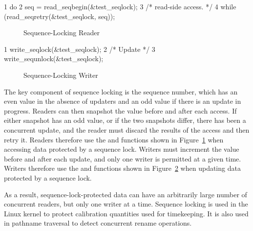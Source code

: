 { \scriptsize
\begin{verbbox}
  1 do {
  2   seq = read_seqbegin(&test_seqlock);
  3   /* read-side access. */
  4 } while (read_seqretry(&test_seqlock, seq));
\end{verbbox}
}
\begin{figure}[bp]
\centering
\theverbbox
\caption{Sequence-Locking Reader}
\label{fig:defer:Sequence-Locking Reader}
\end{figure}

{ \scriptsize
\begin{verbbox}
  1 write_seqlock(&test_seqlock);
  2 /* Update */
  3 write_sequnlock(&test_seqlock);
\end{verbbox}
}
\begin{figure}[bp]
\centering
\theverbbox
\caption{Sequence-Locking Writer}
\label{fig:defer:Sequence-Locking Writer}
\end{figure}

The key component of sequence locking is the sequence number, which has
an even value in the absence of updaters and an odd value if there
is an update in progress.
Readers can then snapshot the value before and after each access.
If either snapshot has an odd value, or if the two snapshots differ,
there has been a concurrent update, and the reader must discard
the results of the access and then retry it.
Readers therefore use the  and 
functions shown in Figure~\ref{fig:defer:Sequence-Locking Reader}
when accessing data protected by a sequence lock.
Writers must increment the value before and after each update,
and only one writer is permitted at a given time.
Writers therefore use the  and 
functions shown in Figure~\ref{fig:defer:Sequence-Locking Writer}
when updating data protected by a sequence lock.

As a result, sequence-lock-protected data can have an arbitrarily
large number of concurrent readers, but only one writer at a time.
Sequence locking is used in the Linux kernel to protect calibration
quantities used for timekeeping.
It is also used in pathname traversal to detect concurrent rename operations.

